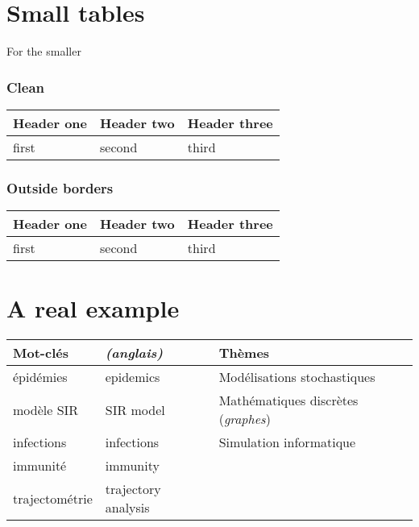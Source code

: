 \documentclass{article}
\begin{document}
\part*{Small tables}

For the smaller

\section*{Clean}


\begin{tabular}{l | l | l}
Header one  &  Header two  &  Header three
\\
\hline

first  &  second  &  third
\\

\end{tabular}

\section*{Outside borders}


\begin{tabular}{ | l | l | l | }
 Header one  &  Header two  &  Header three \\
\hline

 first  &  second  &  third \\

\end{tabular}

\part*{A real example}


\begin{tabular}{ | l | l | l | }
 Mot-clés        &  \textit{(anglais)}          &  Thèmes                              \\
\hline

 épidémies       &  epidemics            &  Modélisations stochastiques         \\

 modèle SIR      &  SIR model            &  Mathématiques discrètes (\textit{graphes}) \\

 infections      &  infections           &  Simulation informatique             \\

 immunité        &  immunity             &                                      \\

 trajectométrie  &  trajectory analysis  &                                      \\

\end{tabular}
\end{document}
